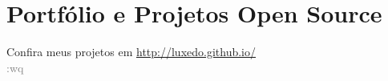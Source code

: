 \documentclass[11pt,a4paper,sans]{moderncv}        %
\begin{document}
\section{Portfólio e Projetos Open Source}
Confira meus projetos em \url{http://luxedo.github.io/}\\
\textcolor{gray}{:wq}


\clearpage
\end{document}
